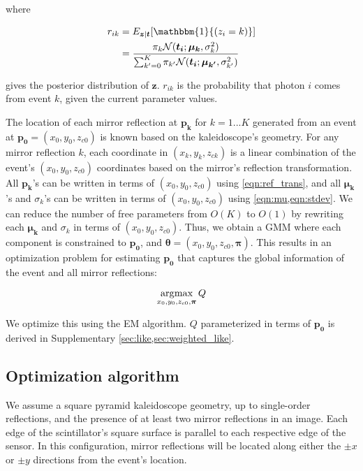 where 
\begin{linenomath}
\begin{equation} \label{eqn:r_ik}
\begin{aligned}
r_{ik} & = E_{\bm{z}|\bm{t}}[\mathbbm{1}{(z_i=k)}] \\ & = \frac{\pi_k \mathcal{N}(\bm{t_i};\bm{\mu_k},{\sigma_k^2})}{\sum_{k'=0}^K \pi_{k'} \mathcal{N}(\bm{t_i};\bm{\mu_{k'}},{\sigma_{k'}^2})}
\end{aligned}
\end{equation}
\end{linenomath}
gives the posterior distribution of $\bm{z}$.
$r_{ik}$ is the probability that photon $i$ comes from event $k$, given 
the current parameter values.

The location of each mirror reflection at $\bm{p_k}$ for $k=1...K$ generated from 
an event at $\bm{p_0}=(x_0,y_0,z_{c0})$ is known based on the kaleidoscope's geometry.
For any mirror reflection $k$, each coordinate in $(x_k,y_k,z_{ck})$ is a linear 
combination of the event's $(x_0,y_0,z_{c0})$ coordinates based on the mirror's 
reflection transformation.
All $\bm{p_k}$'s can be written in terms of $(x_0,y_0,z_{c0})$ using 
\cref{eqn:ref_trans}, and all $\bm{\mu_k}$'s and $\sigma_k$'s can be written in 
terms of $(x_0,y_0,z_{c0})$ using \cref{eqn:mu,eqn:stdev}.
We can reduce the number of free parameters from $O(K)$ 
to $O(1)$ by rewriting each $\bm{\mu_k}$ and $\sigma_k$ in terms of 
$(x_0,y_0,z_{c0})$.
Thus, we obtain a GMM where each component is constrained to $\bm{p_0}$, and 
$\bm{\theta}=(x_0,y_0,z_{c0},\bm{\pi})$.
This results in an optimization problem for estimating $\bm{p_0}$ that captures 
the global information of the event and all mirror reflections:
\begin{linenomath}
\begin{equation} \label{eqn:opti_prob}
\operatorname*{\arg\!\max}_{x_0,y_0,z_{c0},\bm{\pi}} Q
\end{equation}
\end{linenomath}
We optimize this using the EM algorithm.
$Q$ parameterized in terms of $\bm{p_0}$ is derived in Supplementary \cref*{sec:like,sec:weighted_like}.

\subsection{Optimization algorithm}
We assume a square pyramid kaleidoscope geometry, up to single-order reflections, 
and the presence of at least two mirror reflections in an image.
Each edge of the scintillator's square surface is parallel to each respective edge 
of the sensor.
In this configuration, mirror reflections will be located along either the 
$\pm x$ or $\pm y$ directions from the event's location.


